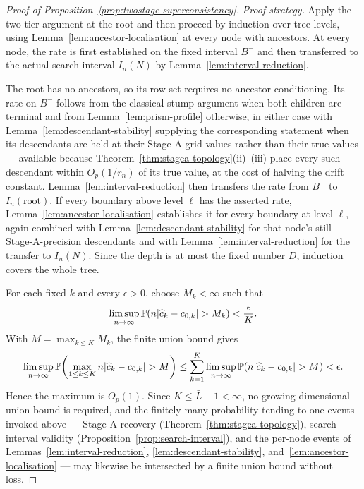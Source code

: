 \documentclass[11pt]{article}
\theoremstyle{plain}
\theoremstyle{definition}
\theoremstyle{remark}
\newcommand{\PP}{\mathbb{P}}
\DeclarePairedDelimiter{\abs}{\lvert}{\rvert}
\begin{document}
\begin{proof}[Proof of Proposition~\ref{prop:twostage-superconsistency}]
\emph{Proof strategy.}
Apply the two-tier argument at the root and then proceed by induction over
tree levels, using Lemma~\ref{lem:ancestor-localisation} at every node with
ancestors. At every node, the rate is first established on the fixed interval
\(B^-\) and then transferred to the actual search interval \(I_n(N)\) by
Lemma~\ref{lem:interval-reduction}.

The root has no ancestors, so its row set requires no ancestor conditioning.
Its rate on \(B^-\) follows from the classical stump argument when both
children are terminal and from Lemma~\ref{lem:prism-profile} otherwise, in
either case with Lemma~\ref{lem:descendant-stability} supplying the
corresponding statement when its descendants are held at their Stage-A grid
values rather than their true values --- available because
Theorem~\ref{thm:stagea-topology}(ii)--(iii) place every such descendant
within \(O_p(1/r_n)\) of its true value, at the cost of halving the drift
constant. Lemma~\ref{lem:interval-reduction} then transfers the rate from
\(B^-\) to \(I_n(\mathrm{root})\). If every boundary above level \(\ell\) has
the asserted rate, Lemma~\ref{lem:ancestor-localisation} establishes it for
every boundary at level \(\ell\), again combined with
Lemma~\ref{lem:descendant-stability} for that node's still-Stage-A-precision
descendants and with Lemma~\ref{lem:interval-reduction} for the transfer to
\(I_n(N)\).  Since the depth is at most the fixed number \(\bar D\), induction
covers the whole tree.

For each fixed \(k\) and every \(\epsilon>0\), choose \(M_k<\infty\) such that
\[
  \limsup_{n\to\infty}
  \PP\!\left(
    n\abs{\widehat c_k-c_{0,k}}>M_k
  \right)
  <
  \frac{\epsilon}{K}.
\]
With \(M=\max_{k\le K}M_k\), the finite union bound gives
\[
  \limsup_{n\to\infty}
  \PP\!\left(
    \max_{1\le k\le K}
    n\abs{\widehat c_k-c_{0,k}}>M
  \right)
  \le
  \sum_{k=1}^K
  \limsup_{n\to\infty}
  \PP\!\left(
    n\abs{\widehat c_k-c_{0,k}}>M
  \right)
  <\epsilon.
\]
Hence the maximum is \(O_p(1)\).  Since
\(K\le\bar L-1<\infty\), no growing-dimensional union bound is required, and
the finitely many probability-tending-to-one events invoked above --- Stage-A
recovery (Theorem~\ref{thm:stagea-topology}), search-interval validity
(Proposition~\ref{prop:search-interval}), and the per-node events of
Lemmas~\ref{lem:interval-reduction}, \ref{lem:descendant-stability},
and~\ref{lem:ancestor-localisation} --- may likewise be intersected by a finite
union bound without loss.
\end{proof}
\end{document}
